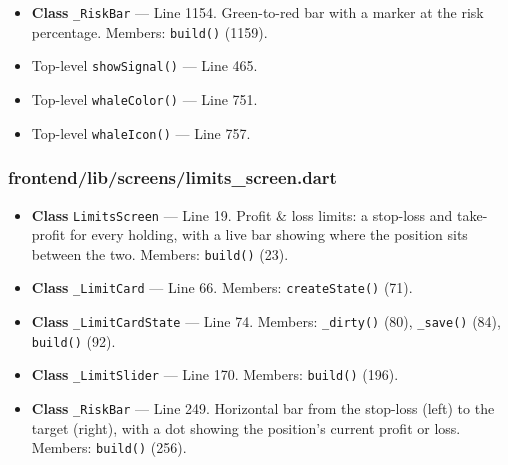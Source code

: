 \begin{itemize}[nosep,leftmargin=1.5em]
\item \textbf{Class} \texttt{\_\allowbreak{}RiskBar} --- Line 1154. Green-to-red bar with a marker at the risk percentage. Members: \texttt{build(\allowbreak{})} (1159).
\item Top-level \texttt{showSignal(\allowbreak{})} --- Line 465.
\item Top-level \texttt{whaleColor(\allowbreak{})} --- Line 751.
\item Top-level \texttt{whaleIcon(\allowbreak{})} --- Line 757.
\end{itemize}
\subsubsection*{frontend/lib/screens/limits\_screen.dart}
\begin{itemize}[nosep,leftmargin=1.5em]
\item \textbf{Class} \texttt{LimitsScreen} --- Line 19. Profit \& loss limits: a stop-loss and take-profit for every holding, with a live bar showing where the position sits between the two. Members: \texttt{build(\allowbreak{})} (23).
\item \textbf{Class} \texttt{\_\allowbreak{}LimitCard} --- Line 66. Members: \texttt{createState(\allowbreak{})} (71).
\item \textbf{Class} \texttt{\_\allowbreak{}LimitCardState} --- Line 74. Members: \texttt{\_\allowbreak{}dirty(\allowbreak{})} (80), \texttt{\_\allowbreak{}save(\allowbreak{})} (84), \texttt{build(\allowbreak{})} (92).
\item \textbf{Class} \texttt{\_\allowbreak{}LimitSlider} --- Line 170. Members: \texttt{build(\allowbreak{})} (196).
\item \textbf{Class} \texttt{\_\allowbreak{}RiskBar} --- Line 249. Horizontal bar from the stop-loss (left) to the target (right), with a dot showing the position's current profit or loss. Members: \texttt{build(\allowbreak{})} (256).
\end{itemize}
